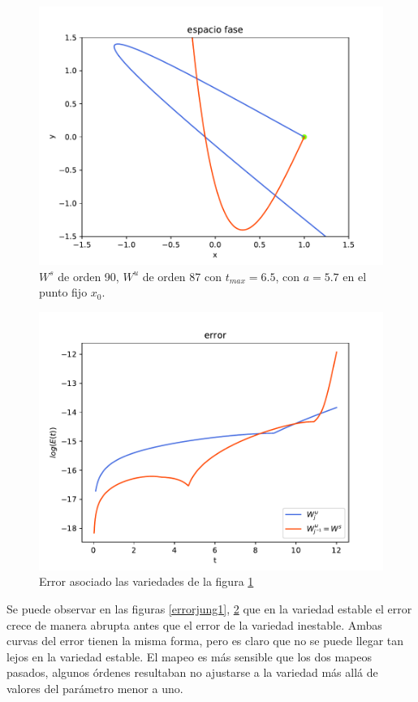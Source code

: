 \begin{figure}[H]
\centering
\includegraphics[scale=0.6]{jung57}
\caption{$W^{s}$ de orden 90, $W^{u}$ de orden 87 con $t_{max}=6.5$, con $a=5.7$ en el punto fijo $x_{0}$.}
\label{jung2}
\end{figure}


\begin{figure}[H]
\centering
\includegraphics[scale=0.6]{error_jung57}
\caption{Error asociado las variedades de la figura \ref{jung2}}
\label{errorjung2}
\end{figure}
Se puede observar en las figuras \ref{errorjung1}, \ref{errorjung2} que en la variedad estable el error crece de manera abrupta antes que el error de la variedad inestable. Ambas curvas del error tienen la misma forma, pero es claro que no se puede llegar tan lejos en la variedad estable. El mapeo es más sensible que los dos mapeos pasados, algunos órdenes resultaban no ajustarse a la variedad más allá de valores del parámetro menor a uno. 



